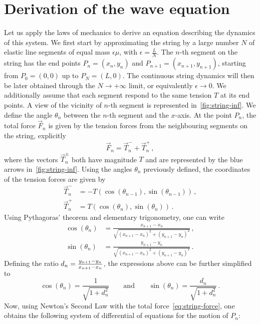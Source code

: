\section{Derivation of the wave equation}
Let us apply the laws of mechanics to derive an equation describing the dynamics of this
system. We first start by approximating the string by a large number $N$ of elastic line
segments of equal mass $\epsilon\mu$, with $\epsilon=\frac{L}{N}$. The $n$-th segment on
the string has the end points $P_n=(x_n,y_n)$ and $P_{n+1}=(x_{n+1},y_{n+1})$, starting
from $P_0=(0,0)$ up to $P_N=(L,0)$. The continuous string dynamics will then be later
obtained through the $N\to+\infty$ limit, or equivalently $\epsilon\to 0$. We additionally
assume that each segment respond to the same tension $T$ at its end points. A view of the
vicinity of $n$-th segment is represented in~\cref{fig:string-inf}. We define the angle
$\theta_n$ between the $n$-th segment and the $x$-axis. At the point $P_n$, the total
force $\vec{F}_n$ is given by the tension forces from the neighbouring segments on the
string, explicitly
\begin{equation}
  \vec{F}_n=\vec{T}_n^-+\vec{T}_n^+\,,\label{eq:string-force}
\end{equation}
where the vectors $\vec{T}_n^\pm$ both have magnitude $T$ and are represented by the blue
arrows in~\cref{fig:string-inf}. Using the angles $\theta_n$ previously defined, the
coordinates of the tension forces are given by
\begin{align}
  \vec{T}_n^-&=-T(\cos(\theta_{n-1}),\sin(\theta_{n-1}))\,,\\
  \vec{T}_n^+&=T(\cos(\theta_{n}),\sin(\theta_{n}))\,.
\end{align}
Using Pythagoras' theorem and elementary trigonometry, one can write
\begin{align}
  \cos(\theta_n)&=\frac{x_{n+1}-x_n}{\sqrt{(x_{n+1}-x_n)^2+(y_{n+1}-y_n)^2}}\,,\\
  \sin(\theta_n)&=\frac{y_{n+1}-y_n}{\sqrt{(x_{n+1}-x_n)^2+(y_{n+1}-y_n)^2}}\,.
\end{align}
Defining the ratio $d_n=\smash{\frac{y_{n+1}-y_n}{x_{n+1}-x_n}}$, the expressions above
can be further simplified to
\begin{equation}
  \cos(\theta_n)=\frac{1}{\sqrt{1+d_n^2}}\qquad\text{and}\qquad
  \sin(\theta_n)=\frac{d_n}{\sqrt{1+d_n^2}}\,.
\end{equation}
Now, using Newton's Second Law with the total force~\cref{eq:string-force}, one obtains
the following system of differential of equations for the motion of $P_n$:

